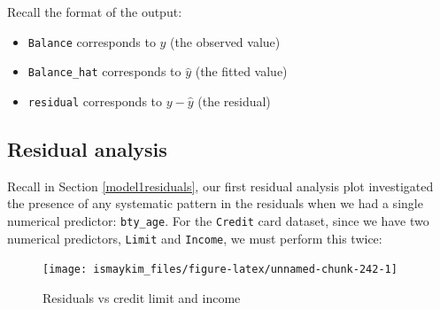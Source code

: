 \documentclass[12pt,]{krantz}
\makeatletter
\newenvironment{Shaded}{\begin{snugshade}}{\end{snugshade}}
\newcommand{\KeywordTok}[1]{\textcolor[rgb]{0.27,0.27,0.27}{\textbf{#1}}}
\newcommand{\DataTypeTok}[1]{\textcolor[rgb]{0.27,0.27,0.27}{#1}}
\newcommand{\StringTok}[1]{\textcolor[rgb]{0.5,0.5,0.5}{#1}}
\newcommand{\OperatorTok}[1]{\textcolor[rgb]{0.43,0.43,0.43}{\textbf{#1}}}
\newcommand{\NormalTok}[1]{#1}
\providecommand{\tightlist}{%
  \setlength{\itemsep}{0pt}\setlength{\parskip}{0pt}}
\newenvironment{kframe}{%
\medskip{}
\setlength{\fboxsep}{.8em}
 \def\at@end@of@kframe{}%
 \ifinner\ifhmode%
  \def\at@end@of@kframe{\end{minipage}}%
  \begin{minipage}{\columnwidth}%
 \fi\fi%
 \def\FrameCommand##1{\hskip\@totalleftmargin \hskip-\fboxsep
 \colorbox{shadecolor}{##1}\hskip-\fboxsep
     \hskip-\linewidth \hskip-\@totalleftmargin \hskip\columnwidth}%
 \MakeFramed {\advance\hsize-\width
   \@totalleftmargin\z@ \linewidth\hsize
   \@setminipage}}%
 {\par\unskip\endMakeFramed%
 \at@end@of@kframe}
\renewenvironment{Shaded}{\begin{kframe}}{\end{kframe}}
\theoremstyle{definition}
\theoremstyle{definition}
\theoremstyle{definition}
\theoremstyle{remark}
\makeatother
\begin{document}
Recall the format of the output:

\begin{itemize}
\tightlist
\item
  \texttt{Balance} corresponds to \(y\) (the observed value)
\item
  \texttt{Balance\_hat} corresponds to \(\widehat{y}\) (the fitted
  value)
\item
  \texttt{residual} corresponds to \(y - \widehat{y}\) (the residual)
\end{itemize}

\subsection{Residual analysis}\label{model3residuals}

Recall in Section \ref{model1residuals}, our first residual analysis
plot investigated the presence of any systematic pattern in the
residuals when we had a single numerical predictor: \texttt{bty\_age}.
For the \texttt{Credit} card dataset, since we have two numerical
predictors, \texttt{Limit} and \texttt{Income}, we must perform this
twice:

\begin{Shaded}
\end{Shaded}

\begin{figure}

{\centering \texttt{[image: ismaykim\_files/figure-latex/unnamed-chunk-242-1]} 

}

\caption{Residuals vs credit limit and income}\label{fig:unnamed-chunk-242}
\end{figure}
\end{document}
